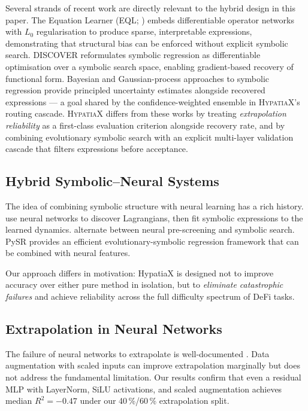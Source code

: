 \documentclass[twoside,11pt]{article}
\newcommand{\Rsq}{R^{2}}
\begin{document}
Several strands of recent work are directly relevant to the hybrid design in
this paper.  The Equation Learner (EQL; \citealt{sahoo2018eql}) embeds
differentiable operator networks with $L_0$ regularisation to produce sparse,
interpretable expressions, demonstrating that structural bias can be enforced
without explicit symbolic search.  DISCOVER \citep{liu2022discover} reformulates
symbolic regression as differentiable optimisation over a symbolic search space,
enabling gradient-based recovery of functional form.  Bayesian and
Gaussian-process approaches to symbolic regression \citep{jin2020bayesian}
provide principled uncertainty estimates alongside recovered expressions ---
a goal shared by the confidence-weighted ensemble in \textsc{HypatiaX}'s
routing cascade.  \textsc{HypatiaX} differs from these works by treating
\emph{extrapolation reliability} as a first-class evaluation criterion
alongside recovery rate, and by combining evolutionary symbolic search with an
explicit multi-layer validation cascade that filters expressions before
acceptance.

\subsection{Hybrid Symbolic--Neural Systems}

The idea of combining symbolic structure with neural learning has a rich history.
\citet{cranmer2020lagrangian} use neural networks to discover Lagrangians, then
fit symbolic expressions to the learned dynamics.  \citet{udrescu2020ai} alternate
between neural pre-screening and symbolic search.  PySR \citep{cranmer2023pysr}
provides an efficient evolutionary-symbolic regression framework that can be
combined with neural features.

Our approach differs in motivation: HypatiaX is designed not to improve accuracy
over either pure method in isolation, but to \emph{eliminate catastrophic failures}
and achieve reliability across the full difficulty spectrum of DeFi tasks.

\subsection{Extrapolation in Neural Networks}

The failure of neural networks to extrapolate is well-documented \citep{xu2021neural}.
Data augmentation with scaled inputs \citep{lim2021temporal} can improve extrapolation
marginally but does not address the fundamental limitation.  Our results confirm
that even a residual MLP with LayerNorm, SiLU activations, and scaled augmentation
achieves median $\Rsq=-0.47$ under our 40\,\%/60\,\% extrapolation split.
\end{document}
